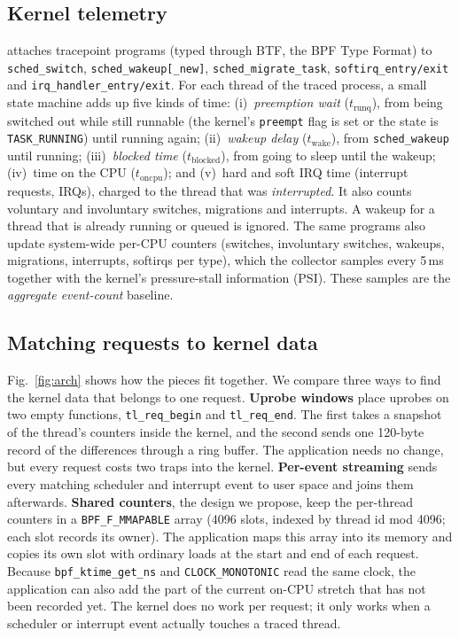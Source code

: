 \subsection{Kernel telemetry}
\label{sec:telemetry}
\sys{} attaches tracepoint programs (typed through BTF, the BPF Type Format) to \texttt{sched\_switch},
\texttt{sched\_wakeup[\_new]}, \texttt{sched\_migrate\_task},
\texttt{softirq\_entry/exit} and \texttt{irq\_handler\_entry/exit}. For each
thread of the traced process, a small state machine adds up five kinds of
time: (i)~\emph{preemption wait} ($t_\mathrm{runq}$), from being switched out while still
runnable (the kernel's \texttt{preempt} flag is set or the state is
\texttt{TASK\_RUNNING}) until running again; (ii)~\emph{wakeup delay} ($t_\mathrm{wake}$), from
\texttt{sched\_wakeup} until running; (iii)~\emph{blocked time} ($t_\mathrm{blocked}$), from going
to sleep until the wakeup; (iv)~time on the CPU ($t_\mathrm{oncpu}$); and (v)~hard and soft IRQ
time (interrupt requests, IRQs), charged to the thread that was \emph{interrupted}. It also counts
voluntary and involuntary switches, migrations and interrupts. A wakeup for
a thread that is already running or queued is ignored. The same
programs also update system-wide per-CPU counters (switches, involuntary
switches, wakeups, migrations, interrupts, softirqs per type), which the
collector samples every 5\,ms together with the kernel's pressure-stall
information (PSI). These samples are the \emph{aggregate event-count}
baseline.

\subsection{Matching requests to kernel data}
\label{sec:matching}
Fig.~\ref{fig:arch} shows how the pieces fit together. We compare three ways to find the kernel data that belongs to one request.
\textbf{Uprobe windows} place uprobes on two empty functions,
\texttt{tl\_req\_begin} and \texttt{tl\_req\_end}. The first takes a
snapshot of the thread's counters inside the kernel, and the second sends
one 120-byte record of the differences through a ring buffer. The
application needs no change, but every request costs two traps into the
kernel. \textbf{Per-event streaming} sends every matching scheduler and
interrupt event to user space and joins them afterwards. \textbf{Shared
counters}, the design we propose, keep the per-thread counters in a
\texttt{BPF\_F\_MMAPABLE} array (4096 slots, indexed by thread id mod 4096;
each slot records its owner). The application maps this array into its
memory and copies its own slot with ordinary loads at the start and end of
each request. Because \texttt{bpf\_ktime\_get\_ns} and
\texttt{CLOCK\_MONOTONIC} read the same clock, the application can also add
the part of the current on-CPU stretch that has not been recorded yet. The
kernel does no work per request; it only works when a scheduler or
interrupt event actually touches a traced thread.


